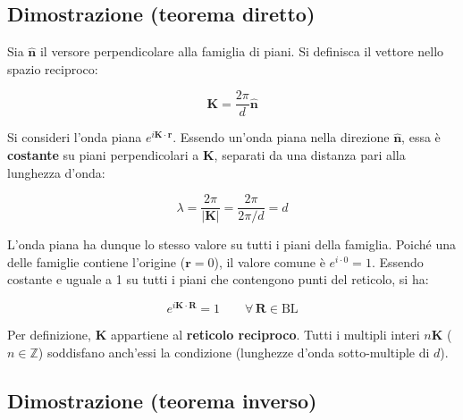 \vspace{0.5cm}
\begin{center}
\end{center}
\vspace{0.5cm}


\subsection{Dimostrazione (teorema diretto)}

Sia $\hat{\mathbf{n}}$ il versore perpendicolare alla famiglia di piani. Si definisca il vettore nello spazio reciproco:

$$\mathbf{K} = \frac{2\pi}{d} \hat{\mathbf{n}}$$

Si consideri l'onda piana $e^{i\mathbf{K} \cdot \mathbf{r}}$. Essendo un'onda piana nella direzione $\hat{\mathbf{n}}$, essa è \textbf{costante} su piani perpendicolari a $\mathbf{K}$, separati da una distanza pari alla lunghezza d'onda:

$$\lambda = \frac{2\pi}{|\mathbf{K}|} = \frac{2\pi}{2\pi/d} = d$$

L'onda piana ha dunque lo stesso valore su tutti i piani della famiglia. Poiché una delle famiglie contiene l'origine ($\mathbf{r} = 0$), il valore comune è $e^{i \cdot 0} = 1$. Essendo costante e uguale a 1 su tutti i piani che contengono punti del reticolo, si ha:

$$e^{i\mathbf{K} \cdot \mathbf{R}} = 1 \qquad \forall\, \mathbf{R} \in \text{BL}$$

Per definizione, $\mathbf{K}$ appartiene al \textbf{reticolo reciproco}. Tutti i multipli interi $n\mathbf{K}$ ($n \in \mathbb{Z}$) soddisfano anch'essi la condizione (lunghezze d'onda sotto-multiple di $d$).

\subsection{Dimostrazione (teorema inverso)}

